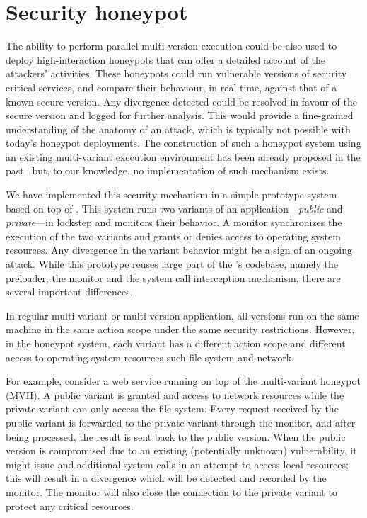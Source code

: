 \section{Security honeypot}
\label{sec:honeypot}

The ability to perform parallel multi-version execution could be also used to
deploy high-interaction honeypots that can offer a detailed account of the
attackers' activities. These honeypots could run vulnerable versions of
security critical services, and compare their behaviour, in real time, against
that of a known secure version.  Any divergence detected could be resolved in
favour of the secure version and logged for further analysis.  This would
provide a fine-grained understanding of the anatomy of an attack, which is
typically not possible with today's honeypot deployments. The construction
of such a honeypot system using an existing multi-variant execution
environment has been already proposed in the past~\cite{jackson10} but,
to our knowledge, no implementation of such mechanism exists.

We have implemented this security mechanism in a simple prototype system based
on top of \varan. This system runs two variants of an
application---\emph{public} and \emph{private}---in lockstep and monitors their
behavior. A monitor synchronizes the execution of the two variants and grants
or denies access to operating system resources. Any divergence in the variant
behavior might be a sign of an ongoing attack. While this prototype reuses
large part of the \varan's codebase, namely the preloader, the monitor and the
system call interception mechanism, there are several important differences.

In regular multi-variant or multi-version application, all versions run on the
same machine in the same action scope under the same security restrictions.
However, in the honeypot system, each variant has a different action scope and
different access to operating system resources such file system and network.

For example, consider a web service running on top of the multi-variant
honeypot (MVH). A public variant is granted and access to network resources
while the private variant can only access the file system. Every request
received by the public variant is forwarded to the private variant through the
monitor, and after being processed, the result is sent back to the public
version. When the public version is compromised due to an existing (potentially
unknown) vulnerability, it might issue and additional system calls in an
attempt to access local resources; this will result in a divergence which will
be detected and recorded by the monitor. The monitor will also close the
connection to the private variant to protect any critical resources.

